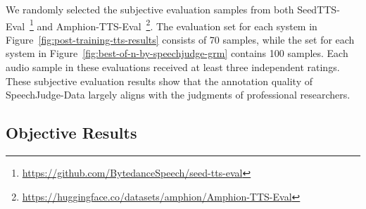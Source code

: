 \documentclass[]{bytedance_seed}
\begin{document}
We randomly selected the subjective evaluation samples from both SeedTTS-Eval~\citep{seedtts}\footnote{\href{https://github.com/BytedanceSpeech/seed-tts-eval}{https://github.com/BytedanceSpeech/seed-tts-eval}} and Amphion-TTS-Eval~\citep{intp,vevo2}\footnote{\href{https://huggingface.co/datasets/amphion/Amphion-TTS-Eval}{https://huggingface.co/datasets/amphion/Amphion-TTS-Eval}}. The evaluation set for each system in Figure~\ref{fig:post-training-tts-results} consists of 70 samples, while the set for each system in Figure~\ref{fig:best-of-n-by-speechjudge-grm} contains 100 samples. Each audio sample in these evaluations received at least three independent ratings. These subjective evaluation results show that the annotation quality of SpeechJudge-Data largely aligns with the judgments of professional researchers.


\subsection{Objective Results}\label{app:post-training-tts}
\end{document}

